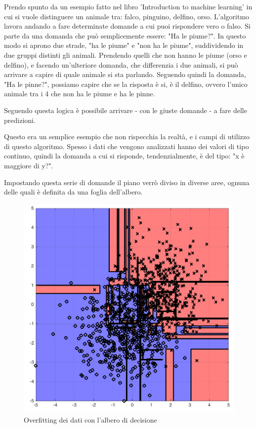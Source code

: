 \documentclass[12pt,italian]{report}
\begin{document}
Prendo spunto da un esempio fatto nel libro 'Introduction to machine learning' in cui si vuole distinguere un animale tra: falco, pinguino, delfino, orso.
L'algoritmo lavora andando a fare determinate domande a cui puoi rispondere vero o falso. Si parte da una domanda che può semplicemente essere: "Ha le piume?". In questo modo si aprono due strade, "ha le piume" e "non ha le piume", suddividendo in due gruppi distinti gli animali. Prendendo quelli che non hanno le piume (orso e delfino), e facendo un'ulteriore domanda, che differenzia i due animali, si può arrivare a capire di quale animale si sta parlando. Seguendo quindi la domanda, "Ha le pinne?", possiamo capire che se la risposta è si, è il delfino, ovvero l'unico animale tra i 4 che non ha le piume e ha le pinne.

Seguendo questa logica è possibile arrivare - con le giuste domande - a fare delle predizioni.

Questo era un semplice esempio che non rispecchia la realtà, e i campi di utilizzo di questo algoritmo. Spesso i dati che vengono analizzati hanno dei valori di tipo continuo, quindi la domanda a cui si risponde, tendenzialmente, è del tipo: "x è maggiore di y?".

Impostando questa serie di domande il piano verrò diviso in diverse aree, ognuna delle quali è definita da una foglia dell'albero. 

\begin{figure}[h!]
	\center
	\includegraphics[scale=0.2]{../img/overfit_decision_trees1} %
	\caption{Overfitting dei dati con l'albero di decisione}
	\label{fig:overfit_decision_trees1}
\end{figure}
\end{document}
